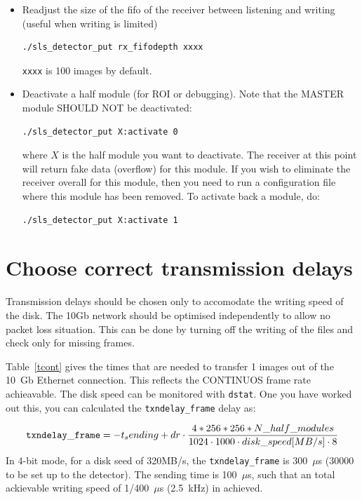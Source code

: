 \documentclass{article}
\begin{document}
{{{\begin{itemize}
\item Readjust the size of the fifo of the receiver between listening and writing (useful when writing is limited)
\begin{verbatim}
./sls_detector_put rx_fifodepth xxxx
\end{verbatim}
 {\tt{xxxx}} is 100 images by default.
\item Deactivate a half module (for ROI or debugging). Note that the MASTER module SHOULD NOT be deactivated:
\begin{verbatim}
./sls_detector_put X:activate 0 
\end{verbatim}
where $X$ is the half module you want to deactivate.
The receiver at this point will return fake data (overflow) for this module. If you wish to eliminate the receiver overall for this module, then you need to run a configuration file where this module has been removed.
To activate back a module, do:
\begin{verbatim}
./sls_detector_put X:activate 1
\end{verbatim}

\end{itemize}

\section{Choose correct transmission delays}\label{delays}

Transmission delays should be chosen only to accomodate the writing speed of the disk. The 10Gb network should be optimised independently to allow no packet loss situation. This can be done by turning off the writing of the files and check only for missing frames. 

Table~\ref{tcont} gives the times that are needed to transfer 1 images out of the 10~Gb Ethernet connection. This reflects the CONTINUOS frame rate achieavable. The disk speed can be monitored with {\tt{dstat}}. One you have worked out this, you can calculated the {\tt{txndelay\_frame}} delay as:

\begin{equation}
 {\tt{txndelay\_frame}}=-t_sending+dr \cdot \frac{4*256*256*N\_half\_modules}{1024 \cdot 1000 \cdot disk\_speed [MB/s] \cdot 8}
\end{equation}
In 4-bit mode, for a disk seed of 320MB/s, the  {\tt{txndelay\_frame}} is 300~$\mu$s (30000 to be set up to the detector). The sending time is 100~$\mu$s, such that an total ackievable writing speed of 1/400~$\mu$s (2.5~kHz) in achieved.  

}}}
\end{document}
